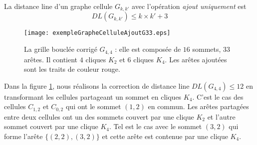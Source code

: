 \begin{lemma}
La distance line d'un graphe cellule $G_{k,k'}$ avec l'op\'eration  {\em ajout uniquement} est 
\begin{equation}
DL(G_{k,k'}) \le k \times k' +3 
\end{equation}
\end{lemma}

\begin{figure}[htb!] 
\centering
\texttt{[image: exempleGrapheCelluleAjoutG33.eps]}
\caption{ La grille boucl\'ee  corrig\'e $G_{4,4}$ : elle est compos\'ee de $16$ sommets, $33$ ar\^etes. Il contient $4$ cliques $K_{2}$ et $6$ cliques $K_4$. Les ar\^etes ajout\'ees sont les traits de couleur rouge.}
\label{exempleCorrectionGrapheCelluleAvecAjout}
\end{figure}
Dans la figure \ref{exempleCorrectionGrapheCelluleAvecAjout}, nous r\'ealisons la correction de distance line $DL(G_{4,4})  \le 12$ en transformant les cellules partageant un sommet en cliques $K_4$. C'est le cas des cellules $C_{1,2}$ et  $C_{0,2}$ qui ont le sommet $(1,2)$ en commun. 
Les ar\^etes partag\'ees entre deux cellules ont un des sommets couvert par une clique $K_2$ et l'autre sommet couvert par une clique $K_4$. Tel est le cas avec le sommet $(3,2)$ qui forme l'ar\^ete $\{(2,2),(3,2)\}$ et cette ar\^ete est contenue par une clique $K_4$.






